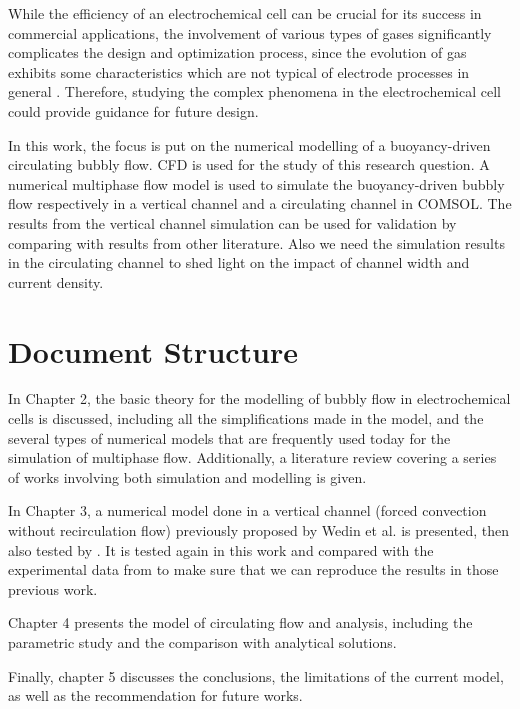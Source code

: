 While the efficiency of an electrochemical cell can be crucial for its success in commercial applications, the involvement of various types of gases significantly complicates the design and optimization process, since the evolution of gas exhibits some characteristics which are not typical of electrode processes in general \cite{Energy}. Therefore, studying the complex phenomena in the electrochemical cell could provide guidance for future design.

In this work, the focus is put on the numerical modelling of a buoyancy-driven circulating bubbly flow. CFD is used for the study of this research question. A numerical multiphase flow model is used to simulate the buoyancy-driven bubbly flow respectively in a vertical channel and a circulating channel in COMSOL. The results from the vertical channel simulation can be used for validation by comparing with results from other literature. Also we need the simulation results in the circulating channel to shed light on the impact of channel width and current density.


\section{Document Structure}
In Chapter 2, the basic theory for the modelling of bubbly flow in electrochemical cells is discussed, including all the simplifications made in the model, and the several types of numerical models that are frequently used today for the simulation of multiphase flow. Additionally, a literature review covering a series of works involving both simulation and modelling is given.

In Chapter 3, a numerical model done in a vertical channel (forced convection without recirculation flow) previously proposed by Wedin et al. \cite{Wedin2001} is presented, then also tested by \cite{Schillings2015a}. It is tested again in this work and compared with the experimental data from \cite{Boissonneau2000} to make sure that we can reproduce the results in those previous work. 

Chapter 4 presents the model of circulating flow and analysis, including the parametric study and the comparison with analytical solutions.

Finally, chapter 5 discusses the conclusions, the limitations of the current model, as well as the recommendation for future works.